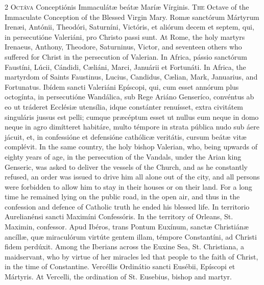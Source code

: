 \begin{paracol}{2}
\lettrine[lines=2]{O}{ctáva} Conceptiónis 
 Immaculátæ beátæ Maríæ Vírginis.
\switchcolumn
{}
\lettrine[lines=2]{T}{he} Octave of the Immaculate 
 Conception of the Blessed Virgin Mary.
\switchcolumn*
{}
Romæ sanctórum Mártyrum 
 Irenæi, Antónii, Theodóri, Saturníni, Victóris, et aliórum decem et septem, 
 qui, in persecutióne Valeriáni, pro Christo passi sunt.
\switchcolumn
{}
At Rome, the holy martyrs Irenaeus, 
 Anthony, Theodore, Saturninus, Victor, and seventeen others who suffered for 
 Christ in the persecution of Valerian.
\switchcolumn*
{}
In Africa, pássio 
 sanctórum Faustíni, Lúcii, Cándidi, Cæliáni, Marci, Januárii et Fortunáti.
\switchcolumn
{}
In Africa, the martyrdom of Saints 
 Faustinus, Lucius, Candidus, Cælian, Mark, Januarius, and Fortunatus.
\switchcolumn*
{}
Ibídem sancti Valeriáni 
 Epíscopi, qui, cum esset annórum plus octogínta, in persecutióne Wandálica, 
 sub Rege Ariáno Genseríco, convéntus ab eo ut tráderet Ecclésiæ utensília, 
 idque constánter renuísset, extra civitátem singuláris jussus est pelli; cumque præcéptum esset ut nullus eum neque in domo neque in agro dimítteret 
 habitáre, multo témpore in strata pública nudo sub áere jácuit, et, in 
 confessióne et defensióne cathólicæ veritátis, cursum beátæ vitæ complévit.
\switchcolumn
{}
In the same country, the holy bishop 
 Valerian, who, being upwards of eighty years of age, in the persecution of 
 the Vandals, under the Arian king Genseric, was asked to deliver the vessels 
 of the Church, and as he constantly refused, an order was issued to drive 
 him all alone out of the city, and all persons were forbidden to allow him 
 to stay in their houses or on their land. For a long time he remained 
 lying on the public road, in the open air, and thus in the confession and 
 defence of Catholic truth he ended his blessed life.
\switchcolumn*
{}
In territorio 
 Aurelianénsi sancti Maximíni Confessóris.
\switchcolumn
{}
In the territory of Orleans, St. 
 Maximin, confessor.
\switchcolumn*
{}
Apud Ibéros, trans 
 Pontum Euxínum, sanctæ Christiánæ ancíllæ, quæ miraculórum virtúte gentem 
 illam, témpore Constantíni, ad Christi fidem perdúxit.
\switchcolumn
{}
Among the Iberians across the Euxine 
 Sea, St. Christiana, a maidservant, who by virtue of her miracles led that 
 people to the faith of Christ, in the time of Constantine.
\switchcolumn*
{}
Vercéllis Ordinátio 
 sancti Eusébii, Epíscopi et Mártyris.
\switchcolumn
{}
At Vercelli, the ordination of St. 
 Eusebius, bishop and martyr.
\switchcolumn*
{}
\end{paracol}


